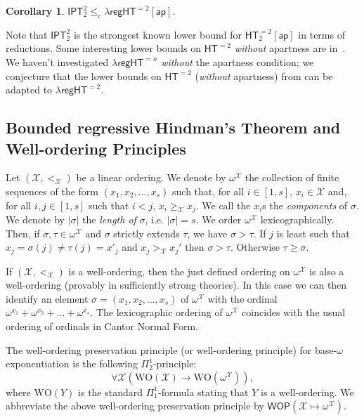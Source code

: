 \documentclass[a4paper,11pt]{article}
\newtheorem{corollary}{Corollary}
\newcommand\HT{\mathsf{HT}}
\newcommand\IPT{\mathsf{IPT}}
\newcommand\regHT{\mathsf{regHT}}
\newcommand\compred{\mathrm{c}}
\newcommand\ap{\mathsf{ap}}
\newcommand\WO{\mathrm{WO}}
\newcommand\ordX{\mathcal{X}}
\newcommand\WOP{\mathsf{WOP}}
\begin{document}
\begin{corollary}\label{coro:regHTtoIPT}
$\IPT^2_2\leq_\mathrm{\compred} \lambda\regHT^{=2}[\ap]$.
\end{corollary}

Note that $\IPT^2_2$ is the strongest known lower bound for $\HT^{=2}_2[\ap]$ in terms of reductions. Some interesting lower bounds on $\HT^{=2}$ \emph{without} apartness are in~\cite{Csi-Dzh-Hir-Joc-Sol-Wes:19}. We haven't investigated $\lambda\regHT^{=n}$ \emph{without} the apartness condition; we conjecture that the lower bounds on $\HT^{=2}$ (\emph{without} apartness) from \cite{Csi-Dzh-Hir-Joc-Sol-Wes:19} can be adapted to $\lambda\regHT^{=2}$.


\subsection{Bounded regressive Hindman's Theorem and Well-ordering Principles}

Let $(\ordX, <_\ordX)$ be a linear ordering. We denote by $\omega^\ordX$ 
the collection of finite sequences of the form $(x_1, x_2, \dots, x_s)$
such that, for all $i \in [1, s]$, $x_i \in \ordX$ and, for all $i,j \in [1,s]$ 
such that $i < j$, $x_i \geq_\ordX x_j$. We call the $x_i$s the \emph{components} of $\sigma$.
We denote by $|\sigma|$ the \emph{length of} $\sigma$, i.e. $|\sigma| = s$. 
We order $\omega^\ordX$ lexicographically. Then, if $\sigma, \tau \in \omega^\ordX$ 
and $\sigma$ strictly extends $\tau$, we have $\sigma > \tau$. If $j$ is least such that
$x_j  = \sigma(j) \neq \tau(j) = x'_j$ and $x_j >_\ordX x_j'$ then $\sigma > \tau$. Otherwise $\tau \geq \sigma$.

If $(\ordX, <_\ordX)$ is a well-ordering, then the just defined ordering on $\omega^\ordX$ is also a well-ordering (provably in sufficiently strong theories). In this case we can then identify an element $\sigma = (x_1, x_2, \dots, x_s)$ of $\omega^\ordX$
with the ordinal $\omega^{x_1}+ \omega^{x_2} + \dots + \omega^{x_s}$. 
The lexicographic ordering of $\omega^\ordX$ coincides with the usual ordering of ordinals in Cantor Normal Form. 

The well-ordering preservation principle (or well-ordering principle) for base-$\omega$ exponentiation is the following $\Pi^1_2$-principle: 
$$ \forall \ordX (\WO(\ordX) \to \WO(\omega^\ordX)),$$
where $\WO(Y)$ is the standard $\Pi^1_1$-formula stating that $Y$ is a well-ordering. We abbreviate the above
well-ordering preservation principle by $\WOP(\ordX \mapsto \omega^\ordX)$.
\end{document}
